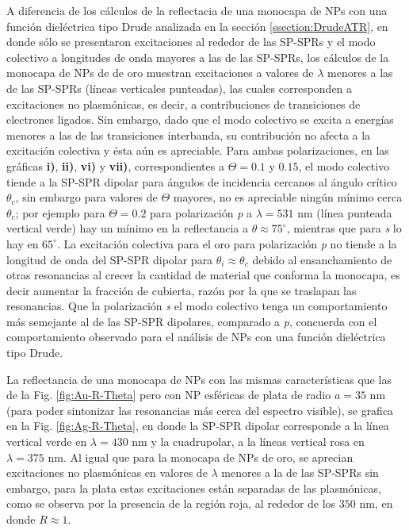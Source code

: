 A diferencia de los cálculos de la reflectacia de una monocapa de NPs  con una función dieléctrica tipo Drude analizada en la sección \ref{ssection:DrudeATR}, en donde sólo se presentaron excitaciones al rededor de las SP-SPRs y el modo colectivo a longitudes de onda mayores a las de las SP-SPRs, los cálculos de la monocapa de NPs de de oro muestran excitaciones a valores de $\lambda$ menores a las de las SP-SPRs (líneas verticales punteadas), las cuales corresponden a excitaciones no plasmónicas, es decir, a contribuciones de transiciones de electrones ligados. Sin embargo, dado que el modo colectivo se excita a energías menores a las de las transiciones interbanda, su contribución no afecta a la excitación colectiva y ésta aún es apreciable. Para ambas polarizaciones, en las gráficas \textbf{i)}, \textbf{ii)}, \textbf{vi)} y \textbf{vii)}, correspondientes a $\Theta=0.1$ y $0.15$, el modo colectivo tiende a la SP-SPR dipolar para ángulos de incidencia cercanos al ángulo crítico $\theta_c$, sin embargo para valores de $\Theta$ mayores, no es apreciable ningún mínimo cerca $\theta_c$; por ejemplo para $\Theta=0.2$ para polarización \emph{p} a $\lambda = 531$ nm (línea punteada vertical verde) hay un mínimo en la reflectancia a $\theta\approx 75^\circ$, mientras que para \emph{s} lo hay en $65^\circ$. La excitación colectiva para el oro para polarización \emph{p} no tiende a la longitud de onda del SP-SPR dipolar para $\theta_i\approx\theta_c$ debido al ensanchamiento de otras resonancias al crecer la cantidad de material que conforma la monocapa, es decir aumentar la fracción de cubierta, razón por la que se traslapan las resonancias.  Que la polarización \emph{s} el modo colectivo tenga un comportamiento más semejante al de las SP-SPR dipolares, comparado a \emph{p}, concuerda con el comportamiento observado para el análisis de NPs con una función dieléctrica tipo Drude.

La reflectancia de una monocapa de NPs con las mismas características que las de la Fig. \ref{fig:Au-R-Theta} pero con NP esféricas de plata de radio $a=35$ nm (para poder sintonizar las resonancias más cerca del espectro visible), se grafica en la Fig. \ref{fig:Ag-R-Theta}, en donde la SP-SPR dipolar corresponde a la línea vertical verde en $\lambda=430$ nm y la cuadrupolar, a la líneas vertical rosa en $\lambda=375$ nm. Al igual que para la monocapa de NPs de oro, se aprecian excitaciones no plasmónicas en valores de $\lambda$ menores a la de las SP-SPRs sin embargo, para la plata estas excitaciones están separadas de las plasmónicas, como se observa por la presencia de la región roja, al rededor de los $350$ nm,  en donde $R\approx 1$. 

